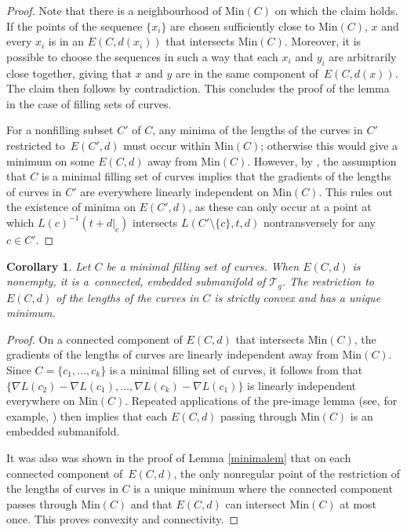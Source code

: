 \documentclass[pdftex]{sigma}
\numberwithin{equation}{section}
\newtheorem{Corollary}[Theorem]{Corollary}
\begin{document}
\begin{proof}
Note that there is a neighbourhood of $\mathrm{Min}(C)$ on which the claim holds. If the points of the sequence $\{x_{i}\}$ are chosen sufficiently close to $\mathrm{Min}(C)$, $x$ and every $x_{i}$ is in an $E(C,d(x_{i}))$ that intersects $\mathrm{Min}(C)$. Moreover, it is possible to choose the sequences in such a way that each $x_{i}$ and $y_{i}$ are arbitrarily close together, giving that $x$ and $y$ are in the same component of~$E(C,d(x))$. The claim then follows by contradiction. This concludes the proof of the lemma in the case of filling sets of curves.

For a nonfilling subset $C'$ of $C$, any minima of the lengths of the curves in $C'$ restricted to~$E(C',d)$ must occur within $\mathrm{Min}(C)$; otherwise this would give a minimum on some $E(C,d)$ away from $\mathrm{Min}(C)$. However, by \cite[Lemma 5]{SchmutzMorse}, the assumption that $C$ is a minimal filling set of curves implies that the gradients of the lengths of curves in $C'$ are everywhere linearly independent on $\mathrm{Min}(C)$. This rules out the existence of minima on $E(C',d)$, as these can only occur at a point at which $L(c)^{-1}(t+d|_{c})$ intersects $L(C'\setminus \{c\},t,d)$ nontransversely for any~${c\in C'}$.
\end{proof}


\begin{Corollary}
\label{linear}
Let $C$ be a minimal filling set of curves. When $E(C,d)$ is nonempty, it is a~connected, embedded submanifold of $\mathcal{T}_{g}$. The restriction to $E(C,d)$ of the lengths of the curves in $C$ is strictly convex and has a unique minimum.
\end{Corollary}

\begin{proof}
On a connected component of $E(C,d)$ that intersects $\mathrm{Min}(C)$, the gradients of the lengths of curves are linearly independent away from $\mathrm{Min}(C)$. Since $C=\{c_{1}, \dots, c_{k}\}$ is a minimal filling set of curves, it follows from \cite[Lemma 5]{SchmutzMorse} that $\bigl\{\nabla L(c_{2})-\nabla L(c_{1}), \dots, \nabla L(c_{k})-\nabla L(c_{1})\bigr\}$ is linearly independent everywhere on $\mathrm{Min}(C)$. Repeated applications of the pre-image lemma (see, for example, \cite[Corollary 5.14]{Lee}) then implies that each $E(C,d)$ passing through $\mathrm{Min}(C)$ is an embedded submanifold.

It was also was shown in the proof of Lemma \ref{minimalem} that on each connected component of~$E(C,d)$, the only nonregular point of the restriction of the lengths of curves in $C$ is a unique minimum where the connected component passes through $\mathrm{Min}(C)$ and that $E(C,d)$ can intersect $\mathrm{Min}(C)$ at most once. This proves convexity and connectivity.
\end{proof}
\end{document}
